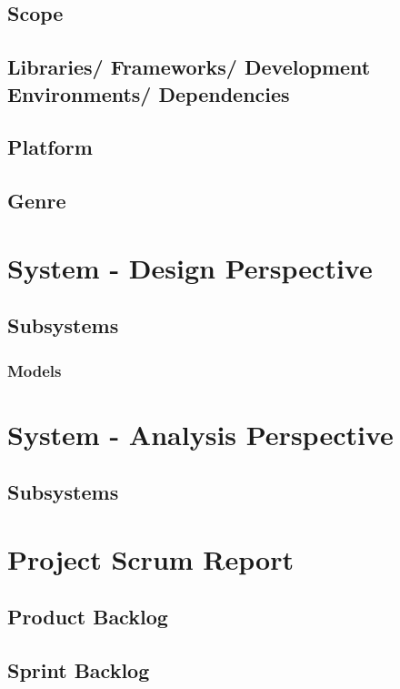 \documentclass{article}
\begin{document}
\subsection{Scope}
\subsection{Libraries/ Frameworks/ Development Environments/ Dependencies}
\subsection{Platform}
\subsection{Genre}
\section{System - Design Perspective}
\subsection{Subsystems}
\subsubsection{Models}

\section{System - Analysis Perspective}
\subsection{Subsystems}

\section{Project Scrum Report}

\subsection{Product Backlog} %

\subsection{Sprint Backlog} %
\end{document}
